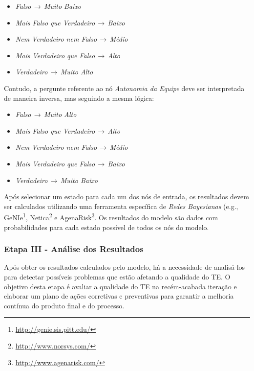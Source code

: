\begin{itemize}
  \item \textit{Falso}$\,\to\,$\textit{Muito Baixo}
  \item \textit{Mais Falso que Verdadeiro}$\,\to\,$\textit{Baixo}
  \item \textit{Nem Verdadeiro nem Falso}$\,\to\,$\textit{Médio}
  \item \textit{Mais Verdadeiro que Falso}$\,\to\,$\textit{Alto}
  \item \textit{Verdadeiro}$\,\to\,$\textit{Muito Alto}
\end{itemize}

Contudo, a pergunte referente ao nó \textit{Autonomia da Equipe} deve ser interpretada de maneira inversa, mas seguindo a mesma lógica:

\begin{itemize}
  \item \textit{Falso}$\,\to\,$\textit{Muito Alto}
  \item \textit{Mais Falso que Verdadeiro}$\,\to\,$\textit{Alto}
  \item \textit{Nem Verdadeiro nem Falso}$\,\to\,$\textit{Médio}
  \item \textit{Mais Verdadeiro que Falso}$\,\to\,$\textit{Baixo}
  \item \textit{Verdadeiro}$\,\to\,$\textit{Muito Baixo}
\end{itemize}

Após selecionar um estado para cada um dos nós de entrada, os resultados devem ser calculados utilizando uma ferramenta específica de \textit{Redes Bayesianas} (e.g., GeNIe\footnote{\url{http://genie.sis.pitt.edu/}}, Netica\footnote{\url{http://www.norsys.com/}} e AgenaRisk\footnote{\url{http://www.agenarisk.com/}}. Os resultados do modelo são dados com probabilidades para cada estado possível de todos os nós do modelo.

\subsubsection{Etapa III - Análise dos Resultados}
\label{descricao:analise}

Após obter os resultados calculados pelo modelo, há a necessidade de analisá-los para detectar possíveis problemas que estão afetando a qualidade do TE. O objetivo desta etapa é avaliar a qualidade do TE na recém-acabada iteração e elaborar um plano de ações corretivas e preventivas para garantir a melhoria contínua do produto final e do processo. 

